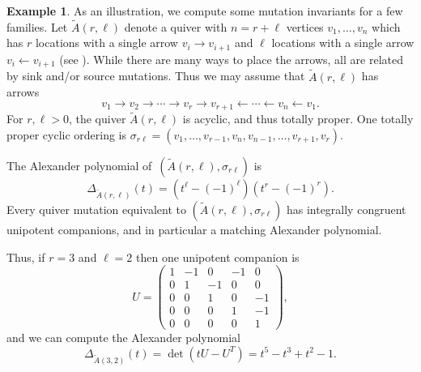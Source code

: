\documentclass[11pt, letterpaper]{amsart}
\newcommand{\hide}[1]{}
\theoremstyle{definition}
\newtheorem{example}[theorem]{Example}
\numberwithin{equation}{section}
\begin{document}
\begin{example}
\label{eg:acyclic cycles}
As an illustration, we compute some mutation invariants for a few families.
Let $\tilde A(r, \ell)$ denote a quiver with $n = r + \ell$ vertices $v_1, \ldots, v_n$ which has $r$ locations with a single arrow $v_i \rightarrow v_{i+1}$ and $\ell$ locations with a single arrow $v_i \leftarrow v_{i+1}$ (see \cite[Example~6.9]{cats1}).
While there are many ways to place the arrows, all are related by sink and/or source mutations.
Thus we may assume that $\tilde A(r, \ell)$ has arrows
$$v_1 \rightarrow v_2 \rightarrow \cdots \rightarrow v_r \rightarrow v_{r+1} \leftarrow \cdots \leftarrow v_{n} \leftarrow v_1.$$
For $r, \ell > 0$, the quiver $\tilde A(r, \ell)$ is acyclic, and thus totally proper.
One totally proper cyclic ordering is $\sigma_{r\ell} = (v_1, \ldots, v_{r-1}, v_n, v_{n-1}, \ldots, v_{r+1}, v_r)$.

The Alexander polynomial of~$(\tilde A(r, \ell), \sigma_{r\ell})$ is 
$$\Delta_{\tilde A(r, \ell)}(t)= (t^\ell - (-1)^{\ell}) (t^r - (-1)^r).$$
Every quiver mutation equivalent to $(\tilde A(r, \ell), \sigma_{r \ell})$ has integrally congruent unipotent companions, and in particular a matching Alexander polynomial.

Thus, if $r=3$ and $\ell=2$ then one unipotent companion is
$$U = \begin{pmatrix}
1 & -1 & 0 & -1 & 0 \\
0 & 1 & -1 & 0 & 0 \\
0 & 0 & 1 & 0 & -1 \\
0 & 0 & 0 & 1 & -1 \\
0 & 0 & 0 & 0 & 1
\end{pmatrix},$$
and we can compute the Alexander polynomial $$\Delta_{\tilde A(3,2)}(t) = \det(t U - U^T)=t^5 - t^3 + t^2 - 1.$$
\hide{
We compute unipotent companions and their associated Alexander polynomials:

}
\end{example}
\end{document}
